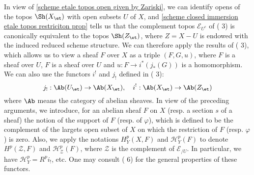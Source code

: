In view of \cref{scheme etale topos open given by Zariski}, we can identify opens of the topos $\Sh(X_\et)$ with open subsets $U$ of $X$, and \cref{scheme closed immersion etale topos restriciton prop} tells us that the complement topos $\mathcal{E}_{U^c}$ of (\cite{SGA4-1}  3) is canonically equivalent to the topos $\Sh(Z_\et)$, where $Z=X-U$ is endowed with the induced reduced scheme structure. We can therefore apply the results of (\cite{SGA4-1}  3), which allows us to view a sheaf $F$ over $X$ as a triple $(F,G,u)$, where $F$ is a sheaf over $U$, $F$ is a sheaf over $U$ and $u:F\to i^*(j_*(G))$ is a homomorphism. We can also use the functors $i^!$ and $j_!$ defined in (\cite{SGA4-1}  3):
\[j_!:\Ab(U_\et)\to \Ab(X_\et),\quad i^!:\Ab(X_\et)\to \Ab(Z_\et)\]
where $\Ab$ means the category of abelian sheaves. In view of the preceding arguments, we introduce, for an abelian sheaf $F$ on $X$ (resp. a section $s$ of a sheaf) the notion of the support of $F$ (resp. of $\varphi$), which is defined to be the complement of the largets open subset of $X$ on which the restriction of $F$ (resp. $\varphi$) is zero. Also, we apply the notations $H_Y^p(X,F)$ and $\mathcal{H}^p_Y(F)$ to denote $H^p(\mathcal{Z},F)$ and $\mathcal{H}^p_{\mathcal{Z}}(F)$, where $\mathcal{Z}$ is the complement of $\mathcal{E}_{/U}$. In particular, we have $\mathcal{H}^p_Y=R^pi_!$, etc. One may consult (\cite{SGA4-1}  6) for the general properties of these functors.

